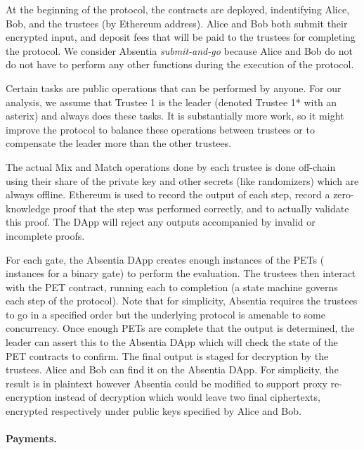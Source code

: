 At the beginning of the protocol, the contracts are deployed, indentifying Alice, Bob, and the trustees (by Ethereum address). Alice and Bob both submit their encrypted input, and deposit fees that will be paid to the trustees for completing the protocol. We consider Absentia \emph{submit-and-go} because Alice and Bob do not do not have to perform any other functions during the execution of the protocol. 
 
Certain tasks are public operations that can be performed by anyone. For our analysis, we assume that Trustee 1 is the leader (denoted Trustee 1* with an asterix) and always does these tasks. It is substantially more work, so it might improve the protocol to balance these operations between trustees or to compensate the leader more than the other trustees.

The actual Mix and Match operations done by each trustee is done off-chain using their share of the private key and other secrets (like randomizers) which are always offline. Ethereum is used to record the output of each step, record a zero-knowledge proof that the step was performed correctly, and to actually validate this proof. The DApp will reject any outputs accompanied by invalid or incomplete proofs.
 
For each gate, the Absentia DApp creates enough instances of the PETs ( instances for a binary gate) to perform the evaluation. The trustees then interact with the PET contract, running each to completion (a state machine governs each step of the protocol). Note that for simplicity, Absentia requires the trustees to go in a specified order but the underlying protocol is amenable to some concurrency. Once enough PETs are complete that the output is determined, the leader can assert this to the Absentia DApp which will check the state of the PET contracts to confirm. The final output is staged for decryption by the trustees. Alice and Bob can find it on the Absentia DApp. For simplicity, the result is in plaintext however Absentia could be modified to support proxy re-encryption instead of decryption which would leave two final ciphertexts,  encrypted respectively under public keys specified by Alice and Bob. 


\paragraph{Payments.}


